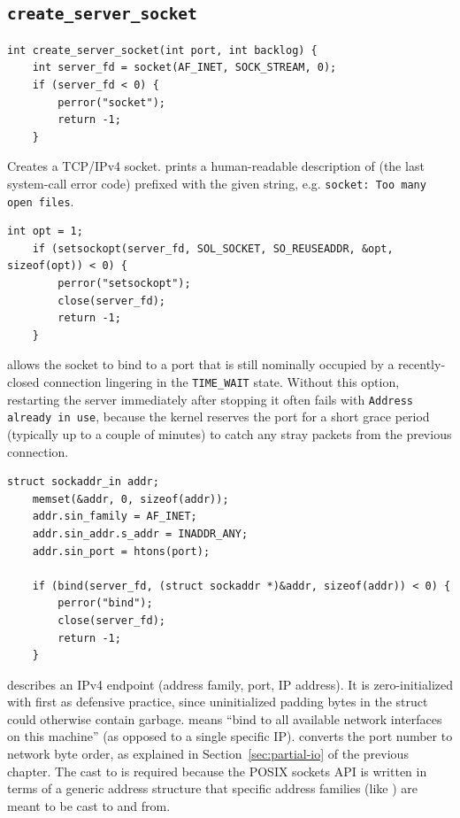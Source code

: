 \subsection{\texttt{create\_server\_socket}}

\begin{lstlisting}[style=cstyle]
int create_server_socket(int port, int backlog) {
    int server_fd = socket(AF_INET, SOCK_STREAM, 0);
    if (server_fd < 0) {
        perror("socket");
        return -1;
    }
\end{lstlisting}

Creates a TCP/IPv4 socket.  prints a human-readable description of  (the last system-call error code) prefixed with the given string, e.g. \texttt{socket: Too many open files}.

\begin{lstlisting}[style=cstyle]
    int opt = 1;
    if (setsockopt(server_fd, SOL_SOCKET, SO_REUSEADDR, &opt, sizeof(opt)) < 0) {
        perror("setsockopt");
        close(server_fd);
        return -1;
    }
\end{lstlisting}

 allows the socket to bind to a port that is still nominally occupied by a recently-closed connection lingering in the \texttt{TIME\_WAIT} state. Without this option, restarting the server immediately after stopping it often fails with \texttt{Address already in use}, because the kernel reserves the port for a short grace period (typically up to a couple of minutes) to catch any stray packets from the previous connection.

\begin{lstlisting}[style=cstyle]
    struct sockaddr_in addr;
    memset(&addr, 0, sizeof(addr));
    addr.sin_family = AF_INET;
    addr.sin_addr.s_addr = INADDR_ANY;
    addr.sin_port = htons(port);

    if (bind(server_fd, (struct sockaddr *)&addr, sizeof(addr)) < 0) {
        perror("bind");
        close(server_fd);
        return -1;
    }
\end{lstlisting}

 describes an IPv4 endpoint (address family, port, IP address). It is zero-initialized with  first as defensive practice, since uninitialized padding bytes in the struct could otherwise contain garbage.  means ``bind to all available network interfaces on this machine'' (as opposed to a single specific IP).  converts the port number to network byte order, as explained in Section~\ref{sec:partial-io} of the previous chapter. The cast to  is required because the POSIX sockets API is written in terms of a generic address structure that specific address families (like ) are meant to be cast to and from.

